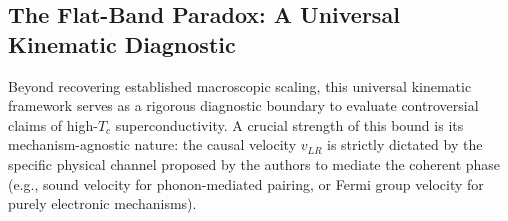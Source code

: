 \documentclass[11pt,a4paper]{article}
\begin{document}




\subsection*{The Flat-Band Paradox: A Universal Kinematic Diagnostic}

Beyond recovering established macroscopic scaling, this universal kinematic framework serves as a rigorous diagnostic boundary to evaluate controversial claims of high-$T_c$ superconductivity. A crucial strength of this bound is its mechanism-agnostic nature: the causal velocity $v_{LR}$ is strictly dictated by the specific physical channel proposed by the authors to mediate the coherent phase (e.g., sound velocity for phonon-mediated pairing, or Fermi group velocity for purely electronic mechanisms).
\end{document}

